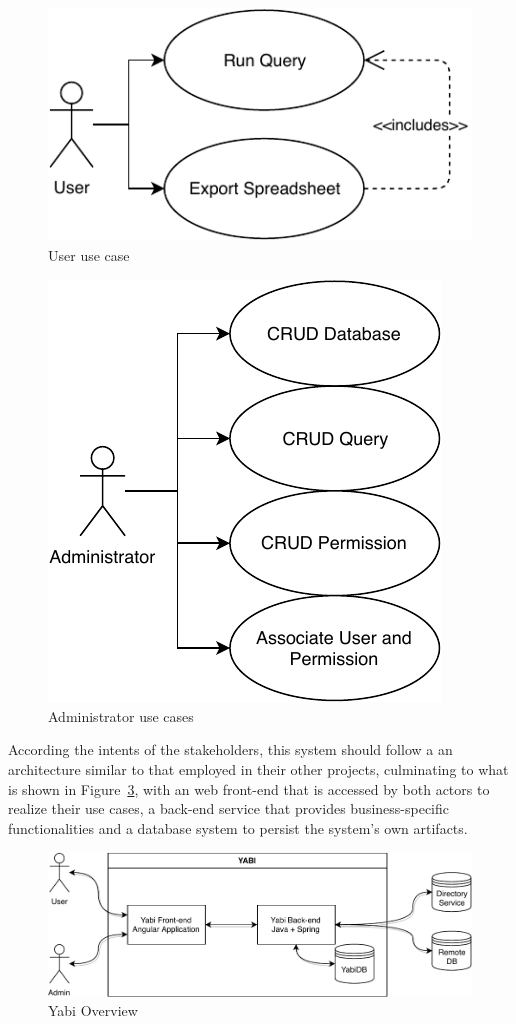 \begin{figure}
  \centering
  \includegraphics[width=.5\textwidth]{images/diagramas/userusecase}
  \caption{User use case}\label{fig:userusecase}
\end{figure}

\begin{figure}
  \centering
  \includegraphics[width=.5\textwidth]{images/diagramas/adminusecase}
  \caption{Administrator use cases}\label{fig:adminusecases}
\end{figure}

According the intents of the stakeholders, this system should follow a an architecture similar to that employed in their other projects, culminating to what is shown in Figure~\ref{fig:overview}, with an web front-end that is accessed by both actors to realize their use cases, a back-end service that provides business-specific functionalities and a database system to persist the system's own artifacts.

\begin{figure}
  \centering
  \includegraphics[width=\textwidth]{images/diagramas/overview.pdf}
  \caption{Yabi Overview}\label{fig:overview}
\end{figure}


